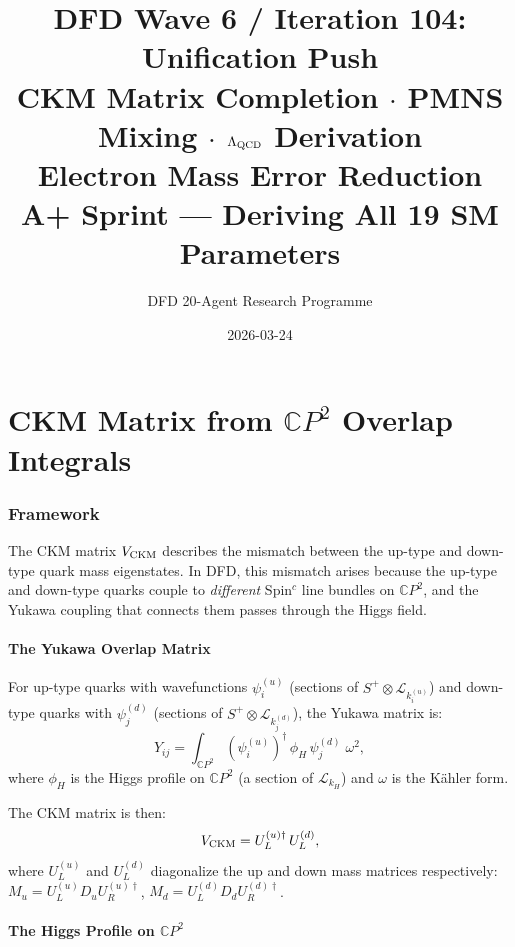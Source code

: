 \documentclass[11pt,a4paper]{article}
\title{DFD Wave 6 / Iteration 104: Unification Push\\[6pt]
\large CKM Matrix Completion $\cdot$ PMNS Mixing $\cdot$ $\Lambda_{\rm QCD}$ Derivation\\
Electron Mass Error Reduction\\[6pt]
\normalsize A+ Sprint --- Deriving All 19 SM Parameters}
\author{DFD 20-Agent Research Programme}
\date{2026-03-24}
\theoremstyle{remark}
\newcommand{\CP}{\mathbb{C}P}
\begin{document}
\maketitle
\tableofcontents
\newpage

\part{CKM Matrix from $\CP^2$ Overlap Integrals}
\label{part:CKM}

\section{Framework}

The CKM matrix $V_{\rm CKM}$ describes the mismatch between the up-type
and down-type quark mass eigenstates. In DFD, this mismatch arises because
the up-type and down-type quarks couple to \emph{different} Spin$^c$ line
bundles on $\CP^2$, and the Yukawa coupling that connects them passes through
the Higgs field.

\subsection{The Yukawa Overlap Matrix}

For up-type quarks with wavefunctions $\psi_i^{(u)}$ (sections of
$S^+ \otimes \mathcal{L}_{k_i^{(u)}}$) and down-type quarks with
$\psi_j^{(d)}$ (sections of $S^+ \otimes \mathcal{L}_{k_j^{(d)}}$),
the Yukawa matrix is:
\begin{equation}
Y_{ij} = \int_{\CP^2} (\psi_i^{(u)})^\dagger\,\phi_H\,\psi_j^{(d)}\;\omega^2,
\label{eq:yukawa-matrix}
\end{equation}
where $\phi_H$ is the Higgs profile on $\CP^2$ (a section of $\mathcal{L}_{k_H}$)
and $\omega$ is the K\"ahler form.

The CKM matrix is then:
\begin{equation}
V_{\rm CKM} = U_L^{(u)\dagger}\,U_L^{(d)},
\end{equation}
where $U_L^{(u)}$ and $U_L^{(d)}$ diagonalize the up and down mass matrices
respectively: $M_u = U_L^{(u)}D_u U_R^{(u)\dagger}$, $M_d = U_L^{(d)}D_d U_R^{(d)\dagger}$.

\subsection{The Higgs Profile on $\CP^2$}
\end{document}

